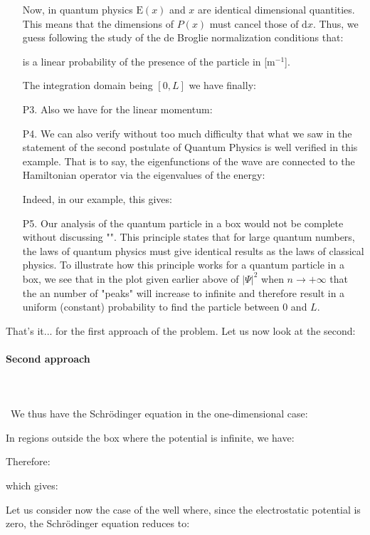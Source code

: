 \begin{enumerate}
		Now, in quantum physics $\text{E}(x)$ and $x$ are identical dimensional quantities. This means that the dimensions of $P(x)$ must cancel those of $\mathrm{d}x$. Thus, we guess following the study of the de Broglie normalization conditions that:
		
		is a linear probability of the presence of the particle in [m$ ^{-1}$].
		
		The integration domain being $[0, L]$ we have finally:
		
		
		\item[P3.] Also we have for the linear momentum:
		
		
		\item[P4.] We can also verify without too much difficulty that what we saw in the statement of the second postulate of Quantum Physics is well verified  in this example. That is to say, the eigenfunctions of the wave are connected to the Hamiltonian operator via the eigenvalues of the energy:
		
		Indeed, in our example, this gives:
		
		
		\item[P5.] Our analysis of the quantum particle in a box would not be complete without discussing "". This principle states that for large quantum numbers, the laws of quantum physics must give identical results as the laws of classical physics. To illustrate how this principle works for a quantum particle in a box, we see that in the plot given earlier above of $|\Psi|^2$ when $n\rightarrow +\infty$ that the an number of "peaks" will increase to infinite and therefore result in a uniform (constant) probability to find the particle between $0$ and $L$.
	\end{enumerate}
	That's it... for the first approach of the problem. Let us now look at the second:
	
	
	\paragraph{Second approach}\mbox{}\\\\\
	We thus have the Schrödinger equation in the one-dimensional case:
	
	In regions outside the box where the potential is infinite, we have:
	
	Therefore:
	
	which gives:
	
	Let us consider now the case of the well where, since the electrostatic potential is zero, the Schrödinger equation reduces to:
	
